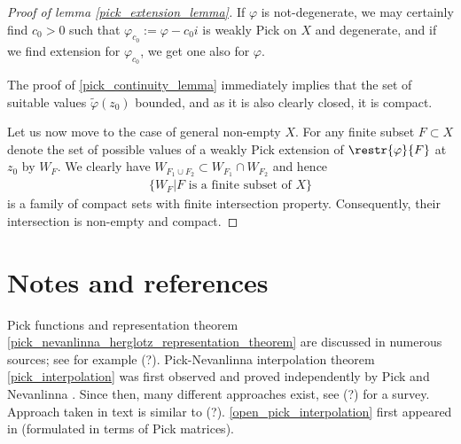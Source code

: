 \begin{proof}[Proof of lemma \ref{pick_extension_lemma}]
	If $\varphi$ is not-degenerate, we may certainly find $c_{0} > 0$ such that $\varphi_{c_{0}} := \varphi - c_{0} i$ is weakly Pick on $X$ and degenerate, and if we find extension for $\varphi_{c_{0}}$, we get one also for $\varphi$.

	The proof of \ref{pick_continuity_lemma} immediately implies that the set of suitable values $\tilde{\varphi}(z_{0})$ bounded, and as it is also clearly closed, it is compact.

	Let us now move to the case of general non-empty $X$. For any finite subset $F \subset X$ denote the set of possible values of a weakly Pick extension of $\restr{\varphi}{F}$ at $z_{0}$ by $W_{F}$. We clearly have $W_{F_{1} \cup F_{2}} \subset W_{F_{1}} \cap W_{F_{2}}$ and hence
	\begin{align*}
		\{ W_{F} | \text{$F$ is a finite subset of $X$}\}
	\end{align*}
	is a family of compact sets with finite intersection property. Consequently, their intersection is non-empty and compact.
\end{proof}

\section{Notes and references}

Pick functions and representation theorem \ref{pick_nevanlinna_herglotz_representation_theorem} are discussed in numerous sources; see for example (?). Pick-Nevanlinna interpolation theorem \ref{pick_interpolation} was first observed and proved independently by Pick \cite{Pick} and Nevanlinna \cite{Nevan}. Since then, many different approaches exist, see (?) for a survey. Approach taken in text is similar to (?). \ref{open_pick_interpolation} first appeared in \cite{Hind} (formulated in terms of Pick matrices).

\begin{comment}

TODO:
\begin{itemize}
	\item Examples of representing measures behind functions and functions behind representing measures
	\item Spectral commutant lifting theorem
	\item Use Morera's theorem to prove weak Hindmarsh's theorem
	\item Nice formula for finite Pick extension (rational function case)
\end{itemize}

\end{comment}







